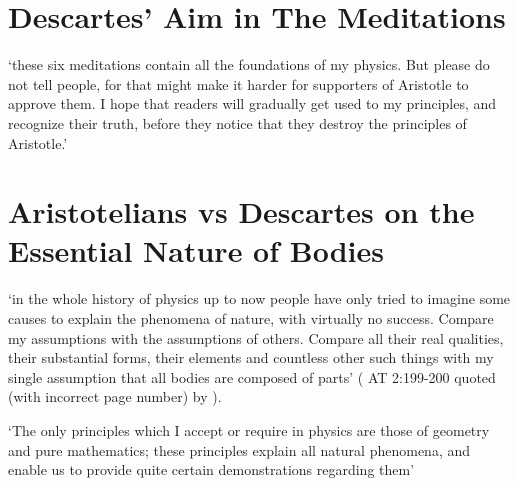 \documentclass[12pt]{extarticle}
\begin{document}
\begin{multicols*}{3}
 
 
\section{Descartes’ Aim in The Meditations}
 
‘these six meditations contain all the foundations of my physics.  But please do not tell people, for that might make it harder for supporters of Aristotle to approve them.  I hope that readers will gradually get used to my principles, and recognize their truth,  before they notice that  they destroy the principles of Aristotle.’ 
 
 
 
\section{Aristotelians vs Descartes on the Essential Nature of Bodies}

‘in the whole history of physics up to now people have
only tried to imagine some causes to explain the phenomena of nature, with
virtually no success.
Compare my assumptions with the assumptions of others.
Compare all their real qualities, their substantial forms, their elements and
countless other such things
with 
my single assumption that 
all bodies are composed of parts’
(\citealp[p.~107]{descartes:1984_vol3} AT 2:199-200 quoted (with incorrect page number) by \citealp{sorell:2018_experimental}).
 
‘The only principles which I accept or require in physics are those of geometry and pure mathematics;  these principles explain all natural phenomena, and enable us to provide quite certain demonstrations  regarding them’  
\citep[p.~247 AT 2:64]{descartes:1985_csm1}
 
 











\footnotesize


\end{multicols*}
\end{document}
